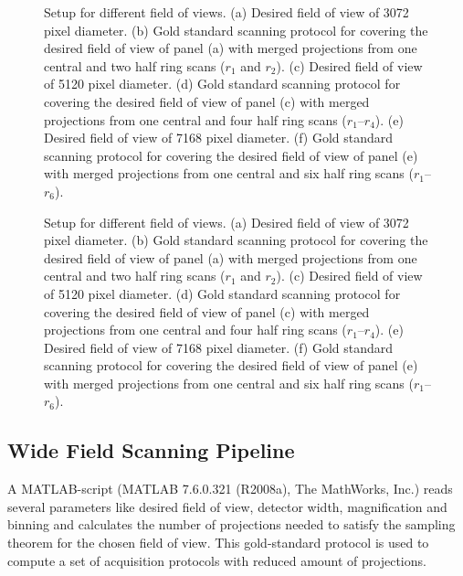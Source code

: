 \ifiucr
	\begin{figure}%
		\centering%
		\caption{Setup for different field of views. %
		(a) Desired field of view of 3072 pixel diameter. %
		(b) Gold standard scanning protocol for covering the desired field of view of panel (a) with merged projections from one central and two half ring scans ($r_{1}$ and $r_{2}$). %
		(c) Desired field of view of 5120 pixel diameter. %
		(d) Gold standard scanning protocol for covering the desired field of view of panel (c) with merged projections from one central and four half ring scans ($r_{1}$--$r_{4}$). %
		(e) Desired field of view of 7168 pixel diameter. %
		(f) Gold standard scanning protocol for covering the desired field of view of panel (e) with merged projections from one central and six half ring scans ($r_{1}$--$r_{6}$).%
		}%
		
		\label{fig:SubScan-Setup}%
	\end{figure}%
\else
	\begin{figure*}[htp]
		\centering%
		
		\caption{Setup for different field of views. %
		(a) Desired field of view of 3072 pixel diameter. %
		(b) Gold standard scanning protocol for covering the desired field of view of panel (a) with merged projections from one central and two half ring scans ($r_{1}$ and $r_{2}$). %
		(c) Desired field of view of 5120 pixel diameter. %
		(d) Gold standard scanning protocol for covering the desired field of view of panel (c) with merged projections from one central and four half ring scans ($r_{1}$--$r_{4}$). %
		(e) Desired field of view of 7168 pixel diameter. %
		(f) Gold standard scanning protocol for covering the desired field of view of panel (e) with merged projections from one central and six half ring scans ($r_{1}$--$r_{6}$).%
		}%
		\label{fig:SubScan-Setup}%
	\end{figure*}
\fi

\subsection{Wide Field Scanning Pipeline}
\label{subsec:wfs-setup}
A MATLAB-script (MATLAB\textsuperscript{\textregistered} 7.6.0.321 (R2008a), The MathWorks, Inc.) reads several parameters like desired field of view, detector width, magnification and binning and calculates the number of projections needed to satisfy the sampling theorem for the chosen field of view. This gold-standard protocol is used to compute a set of acquisition protocols with reduced amount of projections.

